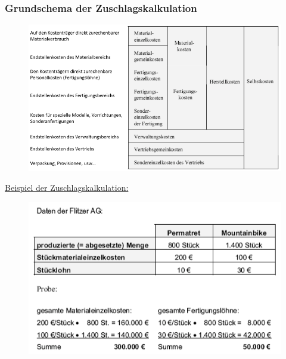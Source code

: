 \documentclass[a4paper,11pt, twoside]{article}
\begin{document}
\subsubsection*{Grundschema der Zuschlagskalkulation}

\begin{figure}[h]
 \begin{center}
   \includegraphics[scale=0.5]{bilder/grundschema_zuschlagskalkulation.png}
 \end{center}
\end{figure}

\underline{Beispiel der Zuschlagskalkulation:}

\begin{figure}[h]
 \begin{center}
   \includegraphics[scale=0.5]{bilder/beispiel_zuschlagskalkulation.png}
 \end{center}
\end{figure}
\end{document}
